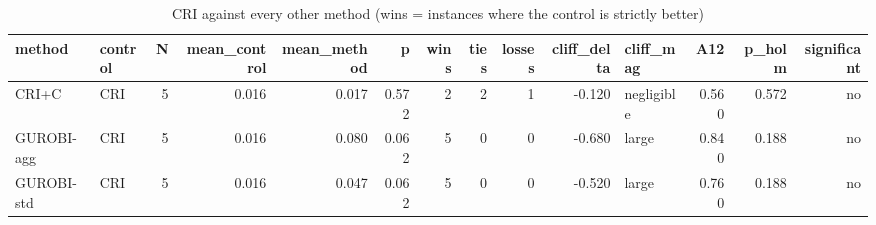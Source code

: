 \begin{table}[htbp]
\centering
\small
\caption{CRI against every other method (wins = instances where the control is strictly better)}
\label{tab:E3x_long_runs_xlarge_b600_vs_CRI}
\begin{tabular}{llrrrrrrrrlrrr}
\toprule
method & control & N & mean\_control & mean\_method & p & wins & ties & losses & cliff\_delta & cliff\_mag & A12 & p\_holm & significant \\
\midrule
CRI+C & CRI & 5 & 0.016 & 0.017 & 0.572 & 2 & 2 & 1 & -0.120 & negligible & 0.560 & 0.572 & no \\
GUROBI-agg & CRI & 5 & 0.016 & 0.080 & 0.062 & 5 & 0 & 0 & -0.680 & large & 0.840 & 0.188 & no \\
GUROBI-std & CRI & 5 & 0.016 & 0.047 & 0.062 & 5 & 0 & 0 & -0.520 & large & 0.760 & 0.188 & no \\
\bottomrule
\end{tabular}
\end{table}
